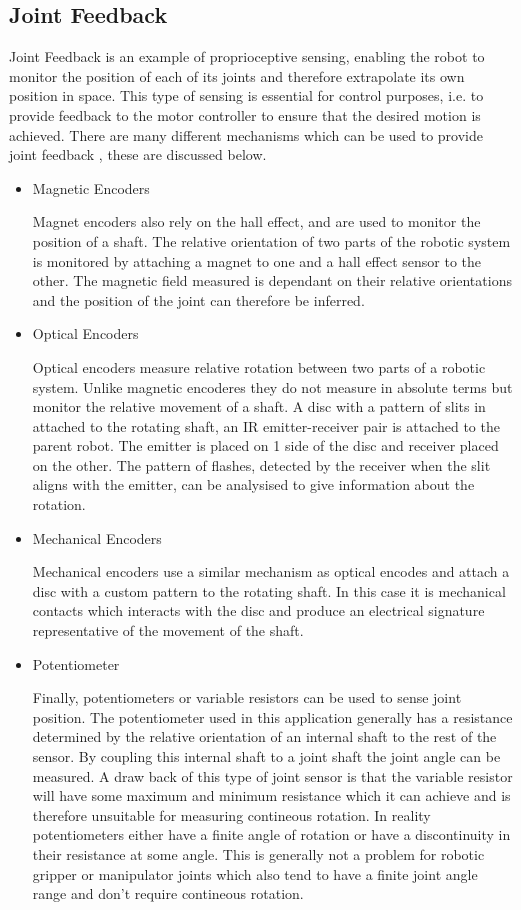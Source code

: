 \subsection{Joint Feedback}
Joint Feedback is an example of proprioceptive sensing, enabling the robot to monitor the position of each of its joints and therefore extrapolate its own position in space. This type of sensing is essential for control purposes, i.e. to provide feedback to the motor controller to ensure that the desired motion is achieved. There are many different mechanisms which can be used to provide joint feedback , these are discussed below.
\begin{itemize}
    \item Magnetic Encoders
    
    Magnet encoders also rely on the hall effect, and are used to monitor the position of a shaft. The relative orientation of two parts of the robotic system is monitored by attaching a magnet to one and a hall effect sensor to the other. The magnetic field measured is dependant on their relative orientations and the position of the joint can therefore be inferred.
    \item Optical Encoders
    
    Optical encoders measure relative rotation between two parts of a robotic system. Unlike magnetic encoderes they do not measure in absolute terms but monitor the relative movement of a shaft. A disc with a pattern of slits in attached to the rotating shaft, an IR emitter-receiver pair is attached to the parent robot. The emitter is placed on 1 side of the disc and receiver placed on the other. The pattern of flashes, detected by the receiver when the slit aligns with the emitter, can be analysised to give information about the rotation. 
    \item Mechanical Encoders
    
    Mechanical encoders use a similar mechanism as optical encodes and attach a disc with a custom pattern to the rotating shaft. In this case it is mechanical contacts which interacts with the disc and produce an electrical signature representative of the movement of the shaft.
    \item Potentiometer
    
    Finally, potentiometers or variable resistors can be used to sense joint position. The potentiometer used in this application generally has a resistance determined by the relative orientation of an internal shaft to the rest of the sensor. By coupling this internal shaft to a joint shaft the joint angle can be measured. A draw back of this type of joint sensor is that the variable resistor will have some maximum and minimum resistance which it can achieve and is therefore unsuitable for measuring contineous rotation. In reality potentiometers either have a finite angle of rotation or have a discontinuity in their resistance at some angle. This is generally not a problem for robotic gripper or manipulator joints which also tend to have a finite joint angle range and don't require contineous rotation.
\end{itemize}

